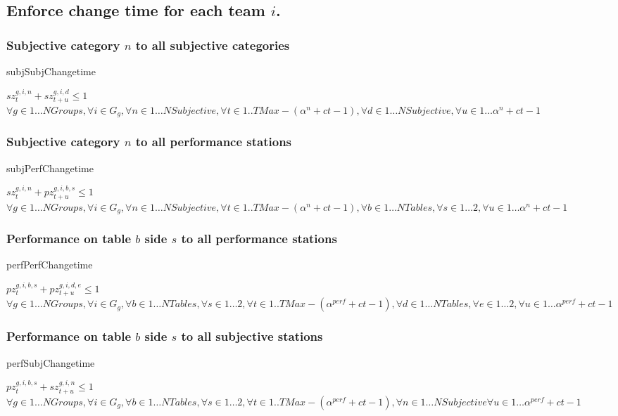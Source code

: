 \documentclass[letterpaper,11pt]{report}
\begin{document}
\FloatBarrier
\subsection{Enforce change time for each team $i$.}

\FloatBarrier
\subsubsection{Subjective category $n$ to all subjective categories}
\begin{algorithm}
\caption{subjSubjChangetime}
$sz_{t}^{g,i,n} + sz_{t+u}^{g,i,d} \le 1$
\hfill $
\forall g \in 1 \dots NGroups,
\forall i \in G_{g},
\forall n \in 1 \dots NSubjective, 
\forall t \in 1..{TMax - (\alpha^{n} + ct - 1)},
\forall d \in 1 \dots NSubjective,
\forall u \in 1 \dots \alpha^{n} + ct - 1$
\end{algorithm}

\FloatBarrier
\subsubsection{Subjective category $n$ to all performance stations}
\begin{algorithm}
\caption{subjPerfChangetime}
$sz_{t}^{g,i,n} + pz_{t+u}^{g,i,b,s} \le 1$
\hfill $
\forall g \in 1 \dots NGroups,
\forall i \in G_{g},
\forall n \in 1 \dots NSubjective, 
\forall t \in 1..{TMax - (\alpha^{n} + ct - 1)},
\forall b \in 1 \dots NTables,
\forall s \in 1 \dots 2,
\forall u \in 1 \dots \alpha^{n} + ct - 1
$
\end{algorithm}

\FloatBarrier
\subsubsection{Performance on table $b$ side $s$ to all performance
  stations}
\begin{algorithm}
\caption{perfPerfChangetime}
$pz_{t}^{g,i,b,s} + pz_{t+u}^{g,i,d,e} \le 1$
\hfill $
\forall g \in 1 \dots NGroups,
\forall i \in G_{g},
\forall b \in 1 \dots NTables,
\forall s \in 1 \dots 2,
\forall t \in 1..{TMax - (\alpha^{perf} + ct - 1)},
\forall d \in 1 \dots NTables,
\forall e \in 1 \dots 2,
\forall u \in 1 \dots \alpha^{perf} + ct - 1$
\end{algorithm}

\FloatBarrier
\subsubsection{Performance on table $b$ side $s$ to all subjective
  stations}
\begin{algorithm}
\caption{perfSubjChangetime}
$pz_{t}^{g,i,b,s} + sz_{t+u}^{g,i,n} \le 1$
\hfill $
\forall g \in 1 \dots NGroups,
\forall i \in G_{g},
\forall b \in 1 \dots NTables,
\forall s \in 1 \dots 2,
\forall t \in 1..{TMax - (\alpha^{perf} + ct - 1)},
\forall n \in 1 \dots NSubjective
\forall u \in 1 \dots \alpha^{perf} + ct - 1$
\end{algorithm}
\end{document}
